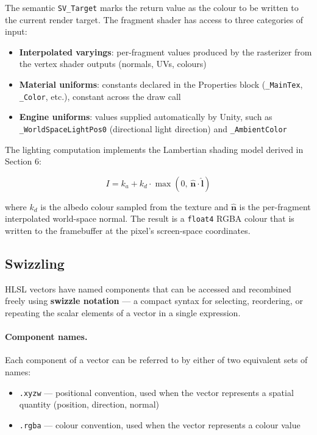 \documentclass[11pt]{article}
\begin{document}
The semantic \texttt{SV\_Target} marks the return value as the colour to be written to the current render target. The fragment shader has access to three categories of input:

\begin{itemize}
    \item \textbf{Interpolated varyings}: per-fragment values produced by the rasterizer from the vertex shader outputs (normals, UVs, colours)
    \item \textbf{Material uniforms}: constants declared in the Properties block (\texttt{\_MainTex}, \texttt{\_Color}, etc.), constant across the draw call
    \item \textbf{Engine uniforms}: values supplied automatically by Unity, such as \texttt{\_WorldSpaceLightPos0} (directional light direction) and \texttt{\_AmbientColor}
\end{itemize}

The lighting computation implements the Lambertian shading model derived in Section 6:

\begin{equation}
    I = k_a + k_d \cdot \max(0,\, \hat{\mathbf{n}} \cdot \hat{\mathbf{l}})
\end{equation}

where $k_d$ is the albedo colour sampled from the texture and $\hat{\mathbf{n}}$ is the per-fragment interpolated world-space normal. The result is a \texttt{float4} RGBA colour that is written to the framebuffer at the pixel's screen-space coordinates.


\subsection{Swizzling}

HLSL vectors have named components that can be accessed and recombined freely using \textbf{swizzle notation} — a compact syntax for selecting, reordering, or repeating the scalar elements of a vector in a single expression.

\paragraph{Component names.} Each component of a vector can be referred to by either of two equivalent sets of names:

\begin{itemize}
    \item \texttt{.xyzw} — positional convention, used when the vector represents a spatial quantity (position, direction, normal)
    \item \texttt{.rgba} — colour convention, used when the vector represents a colour value
\end{itemize}
\end{document}
